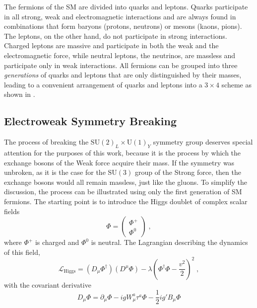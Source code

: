 The fermions of the SM are divided into quarks and leptons. Quarks participate in all strong, weak and electromagnetic interactions and are always found in combinations that form baryons (protons, neutrons) or mesons (kaons, pions). The leptons, on the other hand, do not participate in strong interactions. Charged leptons are massive and participate in both the weak and the electromagnetic force, while neutral leptons, the neutrinos, are massless and participate only in weak interactions. All fermions can be grouped into three \emph{generations} of quarks and leptons that are only distinguished by their masses, leading to a convenient arrangement of quarks and leptons into a $3\times4$ scheme as shown in .

\subsection{Electroweak Symmetry Breaking}
The process of breaking the $\mathrm{SU}(2)_L \times \mathrm{U}(1)_Y$ symmetry group deserves special attention for the purposes of this work, because it is the process by which the exchange bosons of the Weak force acquire their mass. If the symmetry was unbroken, as it is the case for the $\mathrm{SU(3)}$ group of the Strong force, then the exchange bosons would all remain massless, just like the gluons. To simplify the discussion, the process can be illustrated using only the first generation of SM fermions. The starting point is to introduce the Higgs doublet of complex scalar fields
\begin{equation}
    \Phi = \begin{pmatrix}
        \Phi^+ \\
        \Phi^0
    \end{pmatrix}\;,\label{eq:higgs-doublet}
\end{equation}
where $\Phi^+$ is charged and $\Phi^0$ is neutral. The Lagrangian describing the dynamics of this field,
\begin{equation}
    \mathcal{L}_\mathrm{Higgs} = (D_\mu \Phi^\dag)(D^\mu \Phi) - \lambda \left( \Phi^\dag \Phi - \frac{v^2}{2} \right)^2\;,\label{eq:higgs-lagrangian}
\end{equation}
with the covariant derivative
\begin{equation}
    D_\mu \Phi= \partial_\mu \Phi - ig W_\mu^a \tau^a \Phi - \frac{1}{2}ig'B_\mu \Phi
\end{equation}
